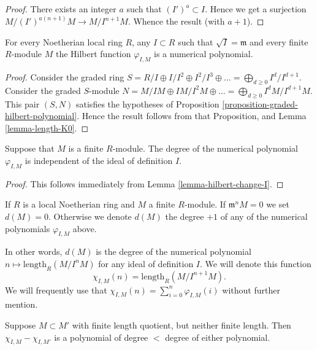\begin{proof}
There exists an integer $a$ such that $(I')^a \subset I$.
Hence we get a surjection $M/(I')^{a(n+1)}M \to M/I^{n+1}M$.
Whence the result (with $a+1$).
\end{proof}

\begin{proposition}
\label{proposition-hilbert-function-polynomial}
For every Noetherian local ring $R$, any $I \subset R$
such that $\sqrt{I} = \mathfrak m$ and every
finite $R$-module $M$ the Hilbert function $\varphi_{I,M}$
is a numerical polynomial.
\end{proposition}

\begin{proof}
Consider the graded ring $S = R/I \oplus I/I^2 \oplus I^2/I^3 \oplus
\ldots = \bigoplus_{d \geq 0} I^d/I^{d+1}$. Consider the graded
$S$-module $N = M/IM \oplus IM/I^2M \oplus \ldots =
\bigoplus_{d \geq 0} I^dM/I^{d+1}M$. This pair $(S, N)$ satisfies
the hypotheses of Proposition \ref{proposition-graded-hilbert-polynomial}.
Hence the result follows from that Proposition, and
Lemma \ref{lemma-length-K0}.
\end{proof}

\begin{lemma}
\label{lemma-d-independent}
Suppose that $M$ is a finite $R$-module.
The degree of the numerical polynomial 
$\varphi_{I,M}$ is independent of the
ideal of definition $I$.
\end{lemma}

\begin{proof}
This follows immediately from Lemma \ref{lemma-hilbert-change-I}.
\end{proof}

\begin{definition}
\label{definition-d}
If $R$ is a local Noetherian ring and $M$ a finite $R$-module.
If $\mathfrak m^nM = 0$ we set $d(M) = 0$.
Otherwise we denote {\it $d(M)$} the degree $+1$ of any of the numerical polynomials
$\varphi_{I,M}$ above.
\end{definition}

\noindent
In other words, $d(M)$ is the degree of the numerical polynomial
$n \mapsto \text{length}_R(M/I^nM)$ for any ideal of definition $I$.
We will denote this function
$$
\chi_{I,M}(n) = \text{length}_R(M/I^{n+1}M).
$$
We will frequently use that $\chi_{I,M}(n)
= \sum_{i=0}^n \varphi_{I,M}(i)$ without further mention.

\begin{lemma}
\label{lemma-differ-finite-chi}
Suppose $M \subset M'$ with finite length quotient,
but neither finite length.
Then $\chi_{I,M} - \chi_{I,M'}$
is a polynomial of degree $<$ degree of either 
polynomial.
\end{lemma}

